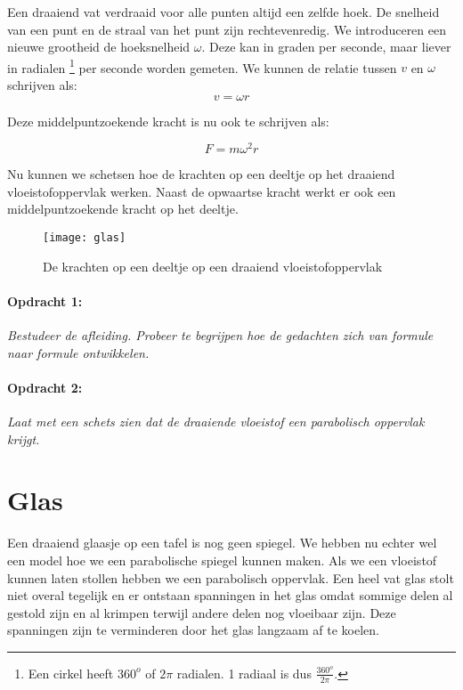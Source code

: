 Een draaiend vat verdraaid voor alle punten altijd een zelfde hoek. De
snelheid van een punt en de straal van het punt zijn rechtevenredig. We
introduceren een nieuwe grootheid de hoeksnelheid $\omega$. Deze kan in
graden per seconde, maar liever in radialen \footnote{Een cirkel heeft
$360^{o}$ of $2\pi$ radialen. 1 radiaal is dus $\frac{360^{o}}{2\pi}$.}
per seconde worden gemeten. We kunnen de relatie tussen $v$ en $\omega$
schrijven als: \begin{equation} v=\omega r \end{equation}


Deze middelpuntzoekende kracht is nu ook te schrijven als:

\begin{equation}
F=m\omega^{2}r
\end{equation}


Nu kunnen we schetsen hoe de krachten op een deeltje op het draaiend
vloeistofoppervlak werken. Naast de opwaartse kracht werkt er ook
een middelpuntzoekende kracht op het deeltje.

\begin{figure}[H]
\noindent \begin{centering}
\texttt{[image: glas]}
\par\end{centering}

\caption{De krachten op een deeltje op een draaiend vloeistofoppervlak}
\end{figure}



\paragraph*{Opdracht 1:}

\emph{Bestudeer de afleiding. Probeer te begrijpen hoe de gedachten
zich van formule naar formule ontwikkelen.}


\paragraph*{Opdracht 2:}

\emph{Laat met een schets zien dat de draaiende vloeistof een parabolisch
oppervlak krijgt. }


\section{Glas}

Een draaiend glaasje op een tafel is nog geen spiegel. We hebben nu
echter wel een model hoe we een parabolische spiegel kunnen maken.
Als we een vloeistof kunnen laten stollen hebben we een parabolisch
oppervlak. Een heel vat glas stolt niet overal tegelijk en er ontstaan
spanningen in het glas omdat sommige delen al gestold zijn en al krimpen
terwijl andere delen nog vloeibaar zijn. Deze spanningen zijn te verminderen
door het glas langzaam af te koelen.

